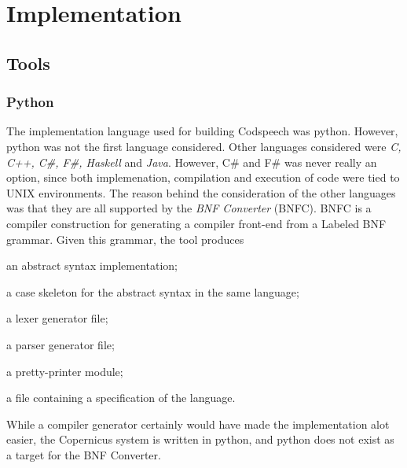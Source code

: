\chapter{Implementation}\label{chap:implementation}


%
%
%

\section{Tools}

\subsection{Python}
The implementation language used for building Codspeech was
python. However, python was not the first language considered. Other
languages considered were \emph{C, C++, C\#, F\#, Haskell} and
\emph{Java}. However, C\# and F\# was never really an option, since
both implemenation, compilation and execution of code were tied to
UNIX environments. The reason behind the consideration of the other
languages was that they are all supported by the \emph{BNF Converter}
(BNFC). \citep{bnfc:online} BNFC is a compiler construction for
generating a compiler front-end from a Labeled BNF grammar. Given this
grammar, the tool produces
\begin{inparaenum}[(1)]
\item an abstract syntax implementation;
\item a case skeleton for the abstract syntax in the same language;
\item a lexer generator file;
\item a parser generator file;
\item a pretty-printer module;
\item a \latex file containing a specification of the language.
\end{inparaenum} \citep{bnfc:online}
While a compiler generator certainly would have made the
implementation alot easier, the Copernicus system is written in
python, and python does not exist as a target for the BNF Converter.

